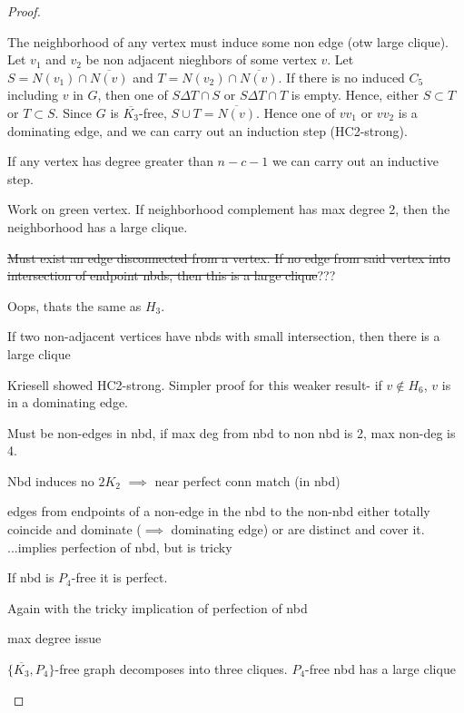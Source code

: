 \documentclass[12 pt]{article}
\newcommand{\kfree}{$\overline{K_3}$-free\xspace}
\begin{document}
\begin{proof}
	\begin{description}
		\item
		\item[$H_0$:] The neighborhood of any vertex must induce some non edge (otw large clique).  Let $v_1$ and $v_2$ be non adjacent nieghbors of some vertex $v$.  Let $S = N(v_1) \cap \overline{N(v)}$ and $T = N(v_2) \cap \overline{N(v)}$.  If there is no induced $C_5$ including $v$ in $G$, then one of $S \Delta T \cap S$ or  $S \Delta T \cap T$ is empty.  Hence, either $S\subset T$ or $T\subset S$.  Since $G$ is \kfree, $S \cup T  = \overline{N(v)}$.  Hence one of $vv_1$ or $vv_2$ is a dominating edge, and we can carry out an induction step (HC2-strong).  
		\item[$H_1$:] If any vertex has degree greater than $n-c-1$ we can carry out an inductive step.
		\item[$H_2$] Work on green vertex.  If neighborhood complement has max degree 2, then the neighborhood has a large clique.
		\item[$H_3$] \sout{Must exist an edge disconnected from a vertex.  If no edge from said vertex into intersection of endpoint nbds, then this is a large clique}???
		\item[$H_4$] Oops, thats the same as $H_3$.
		\item[$H_5$] If two non-adjacent vertices have nbds with small intersection, then there is a large clique
		\item[$H_6$] Kriesell showed HC2-strong.  Simpler proof for this weaker result- if  $v\notin H_6$, $v$ is in a dominating edge.
		\item[$H_7$] Must be non-edges in nbd, if max deg from nbd to non nbd is 2, max non-deg is 4.
		\item[$H_8$] Nbd induces no $2K_2$ $\implies$ near perfect conn match (in nbd)
		\item[$H_9$] edges from endpoints of a non-edge in the nbd to the non-nbd either totally coincide and dominate ($\implies$ dominating edge) or are distinct and cover it. ...implies perfection of nbd, but is tricky
		\item[$H_{10}$] If nbd is $P_4$-free it is perfect.
		\item[$H_{11}$] Again with the tricky implication of perfection of nbd
		\item[$H_{12}$] max degree issue
		\item[$H_{13}$] $\{\overline{K_3}, P_4\}$-free graph decomposes into three cliques.  $P_4$-free nbd has a large clique 
	\end{description}
\end{proof}
\end{document}

